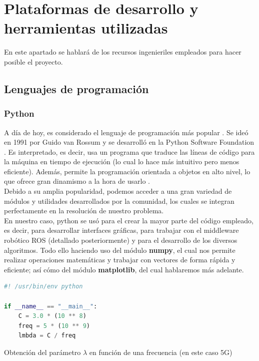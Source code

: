 \chapter{Plataformas de desarrollo y herramientas utilizadas}
\label{cap:capitulo3}

En este apartado se hablará de los recursos ingenieriles empleados para hacer posible el proyecto.

\section{Lenguajes de programación}
\label{sec:lenguajes_programacion}

\subsection{Python}
\label{subsec:python}

A día de hoy, es considerado el lenguaje de programación más popular \cite{tiobe}. Se ideó en 1991 por Guido van Rossum y se desarrolló en la Python Software Foundation \cite{python-history}. Es interpretado, es decir, usa un programa que traduce las líneas de código para la máquina en tiempo de ejecución (lo cual lo hace más intuitivo pero menos eficiente). Además, permite la programación orientada a objetos en alto nivel, lo que ofrece gran dinamismo a la hora de usarlo \cite{python-def} \cite{compiled-vs-interpreted}.\\

Debido a su amplia popularidad, podemos acceder a una gran variedad de módulos y utilidades desarrollados por la comunidad, los cuales se integran perfectamente en la resolución de nuestro problema.\\

En nuestro caso, python se usó para el crear la mayor parte del código empleado, es decir, para desarrollar interfaces gráficas, para trabajar con el middleware robótico \ac{ROS} (detallado posteriormente) y para el desarrollo de los diversos algoritmos. Todo ello haciendo uso del módulo \textbf{numpy}, el cual nos permite realizar operaciones matemáticas y trabajar con vectores de forma rápida y eficiente; así cómo del módulo \textbf{matplotlib}, del cual hablaremos más adelante.\\

\begin{code}[H]
\begin{lstlisting}[language=Python]
#! /usr/bin/env python

if __name__ == "__main__":
	C = 3.0 * (10 ** 8)
	freq = 5 * (10 ** 9)
	lmbda = C / freq
\end{lstlisting}
\caption[Obtención del parámetro lambda en función de una frecuencia (en este caso 5G)]{Obtención del parámetro $\lambda$ en función de una frecuencia (en este caso 5G)}
\label{cod:helloworld_python}
\end{code}

